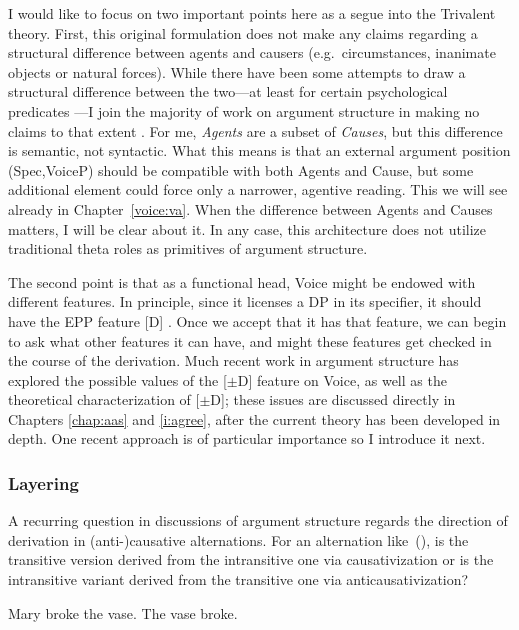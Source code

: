 \begin{exe}
\begin{xlist}
\begin{exe}
\begin{exe}
\begin{exe}
\begin{exe}
\begin{xlist}
\begin{exe}
\begin{xlist}
\begin{xlist}
\begin{xlist}
\begin{exe}
\begin{xlist}
\begin{exe}
\begin{exe}
\begin{exe}
\begin{exe}
\begin{xlist}
I would like to focus on two important points here as a segue into the Trivalent theory. First, this original formulation does not make any claims regarding a structural difference between agents and causers (e.g.~circumstances, inanimate objects or natural forces). While there have been some attempts to draw a structural difference between the two---at least for certain psychological predicates \citep{bellettirizzi88,harleystone13}---I join the majority of work on argument structure in making no claims to that extent \citep[7]{layering15}. For me, \emph{Agents} are a subset of \emph{Causes}, but this difference is semantic, not syntactic. What this means is that an external argument position (Spec,VoiceP) should be compatible with both Agents and Cause, but some additional element could force only a narrower, agentive reading. This we will see already in Chapter~\ref{voice:va}. When the difference between Agents and Causes matters, I will be clear about it. In any case, this architecture does not utilize traditional theta roles as primitives of argument structure.

The second point is that as a functional head, Voice might be endowed with different features. In principle, since it licenses a DP in its specifier, it should have the EPP feature [D] \citep{chomsky95}. Once we accept that it has that feature, we can begin to ask what other features it can have, and might these features get checked in the course of the derivation. Much recent work in argument structure has explored the possible values of the [$\pm$D] feature on Voice, as well as the theoretical characterization of [$\pm$D]; these issues are discussed directly in Chapters \ref{chap:aas} and \ref{i:agree}, after the current theory has been developed in depth. One recent approach is of particular importance so I introduce it next.\label{r1:g:2a1}

		\subsubsection{Layering} \label{intro:arch:layering}
A recurring question in discussions of argument structure regards the direction of derivation in (anti-)causative alternations. For an alternation like~(\nextx), is the transitive version derived from the intransitive one via causativization or is the intransitive variant derived from the transitive one via anticausativization?
 \begin{exe}
 \ex  
 \begin{xlist} 
 	\ex  Mary broke the vase. 
 	\ex  The vase broke. 
 \z
\z 


\end{xlist}
\end{exe}
\end{xlist}
\end{exe}
\end{exe}
\end{exe}
\end{exe}
\end{xlist}
\end{exe}
\end{xlist}
\end{xlist}
\end{xlist}
\end{exe}
\end{xlist}
\end{exe}
\end{exe}
\end{exe}
\end{exe}
\end{xlist}
\end{exe}
